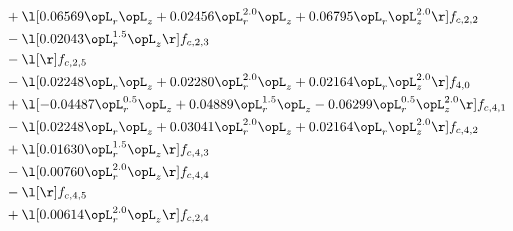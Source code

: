 \begin{alignat}{2}
& + \l[  0.06569 \opL_r \opL_z +  0.02456 \opL_r^{2.0} \opL_z +  0.06795 \opL_r \opL_z^{2.0}  \r] f_{c,2,2} \nonumber \\ 
& - \l[  0.02043 \opL_r^{1.5} \opL_z  \r] f_{c,2,3} \nonumber \\ 
& - \l[  \r] f_{c,2,5} \nonumber \\ 
& - \l[  0.02248 \opL_r \opL_z +  0.02280 \opL_r^{2.0} \opL_z +  0.02164 \opL_r \opL_z^{2.0}  \r] f_{4,0} \nonumber \\ 
& + \l[  -0.04487 \opL_r^{0.5} \opL_z +  0.04889 \opL_r^{1.5} \opL_z   -0.06299 \opL_r^{0.5} \opL_z^{2.0}  \r] f_{c,4,1} \nonumber \\ 
& - \l[  0.02248 \opL_r \opL_z +  0.03041 \opL_r^{2.0} \opL_z +  0.02164 \opL_r \opL_z^{2.0}  \r] f_{c,4,2} \nonumber \\ 
& + \l[  0.01630 \opL_r^{1.5} \opL_z  \r] f_{c,4,3} \nonumber \\ 
& - \l[  0.00760 \opL_r^{2.0} \opL_z  \r] f_{c,4,4} \nonumber \\ 
& - \l[  \r] f_{c,4,5} \nonumber \\ 
& + \l[  0.00614 \opL_r^{2.0} \opL_z  \r] f_{c,2,4} \nonumber \\ 
\end{alignat} 


